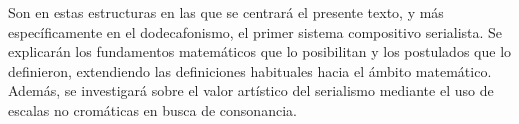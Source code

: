 		Son en estas estructuras en las que se centrará el presente texto, y más específicamente en el dodecafonismo, el primer sistema compositivo serialista. Se explicarán los fundamentos matemáticos que lo posibilitan y los postulados que lo definieron, extendiendo las definiciones habituales hacia el ámbito matemático. Además, se investigará sobre el valor artístico del serialismo mediante el uso de escalas no cromáticas en busca de consonancia.
        
        
        
        
    
    \renewcommand*\contentsname{\begin{LARGE}\textbf{Índice general}\end{LARGE}\vspace{-\bigskipamount}}
	\begin{changemargin}{-0.5cm}{-0.5cm}
		\tableofcontents
	\end{changemargin}
	\newpage
	$\ $
	\thispagestyle{empty}
	\newpage
	$\ $
	\thispagestyle{empty}
	\newpage